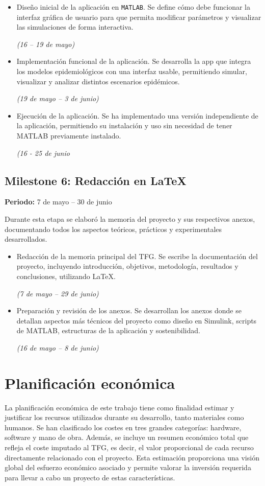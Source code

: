 \begin{itemize}
    \item Diseño inicial de la aplicación en \texttt{MATLAB}. Se define cómo debe funcionar la interfaz gráfica de usuario para que permita modificar parámetros y visualizar las simulaciones de forma interactiva.
    
    \textit{(16 – 19 de mayo)}
    \item Implementación funcional de la aplicación. Se desarrolla la app que integra los modelos epidemiológicos con una interfaz usable, permitiendo simular, visualizar y analizar distintos escenarios epidémicos.

    \textit{(19 de mayo – 3 de junio)}

    \item Ejecución de la aplicación. Se ha implementado una versión independiente de la aplicación, permitiendo su instalación y uso sin necesidad de tener MATLAB previamente instalado.

    \textit{(16 - 25 de junio}
    
\end{itemize}

\subsection*{Milestone 6: Redacción en LaTeX}
\textbf{Periodo:} 7 de mayo – 30 de junio

Durante esta etapa se elaboró la memoria del proyecto y sus respectivos anexos, documentando todos los aspectos teóricos, prácticos y experimentales desarrollados.

\begin{itemize}
    \item Redacción de la memoria principal del TFG. Se escribe la documentación del proyecto, incluyendo introducción, objetivos, metodología, resultados y conclusiones, utilizando LaTeX.
    
    \textit{(7 de mayo – 29 de junio)}
    \item Preparación y revisión de los anexos. Se desarrollan los anexos donde se detallan aspectos más técnicos del proyecto como diseño en Simulink, scripts de MATLAB, estructuras de la aplicación y sostenibilidad. 
    
    \textit{(16 de mayo – 8 de junio)}
\end{itemize}




\section{Planificación económica}
La planificación económica de este trabajo tiene como finalidad estimar y justificar los recursos utilizados durante su desarrollo, tanto materiales como humanos. Se han clasificado los costes en tres grandes categorías: hardware, software y mano de obra. Además, se incluye un resumen económico total que refleja el coste imputado al TFG, es decir, el valor proporcional de cada recurso directamente relacionado con el proyecto. Esta estimación proporciona una visión global del esfuerzo económico asociado y permite valorar la inversión requerida para llevar a cabo un proyecto de estas características.


